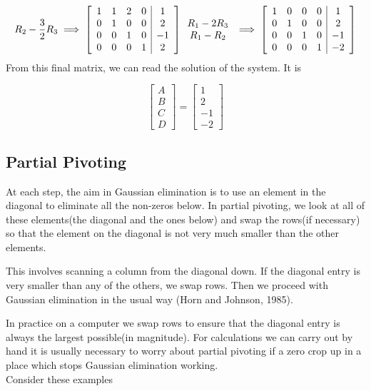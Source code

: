 \documentclass[a4paper, 12pt]{report}
\begin{document}
{     \[
     R_2-\frac{3}{2}R_3 \implies
     \left[ \begin{array}{c c c c| c}
     1& 1& 2& 0& 1\\
     0& 1& 0& 0& 2\\
     0& 0& 1& 0& -1\\
     0& 0& 0& 1& 2
     \end{array} \right]
     \begin{array}{c} R_1-2R_3\\ R_1-R_2 \end{array}
     \implies
     \left[ \begin{array}{c c c c| c}
     1& 0& 0& 0& 1\\
     0& 1& 0& 0& 2\\
     0& 0& 1& 0& -1\\
     0& 0& 0& 1& -2
     \end{array} \right]
     \]
     From this final matrix, we can read the solution of the system. It is
     
     \begin{equation*}
     \begin{bmatrix} A\\B\\C\\D \end{bmatrix}
     =
     \begin{bmatrix} 1\\2\\-1\\-2 \end{bmatrix}
     \end{equation*}
     
     \subsection{Partial Pivoting}
     At each step, the aim in Gaussian elimination is to use an element in the diagonal to eliminate all the non-zeros below. In partial pivoting, we look at all of these elements(the diagonal and the ones below) and swap the rows(if necessary) so that the element on the diagonal is not very much smaller than the other elements.
     
     This involves scanning a column from the diagonal down. If the diagonal entry is very smaller than any of the others, we swap rows. Then we proceed with Gaussian elimination in the usual way (Horn and Johnson, 1985).
     
     In practice on a computer we swap rows to ensure that the diagonal entry is always the largest possible(in magnitude). For calculations we can carry out by hand it is usually necessary to worry about partial pivoting if a zero crop up in a place which stops Gaussian elimination working.\\
     Consider these examples\\
     
}
\end{document}
